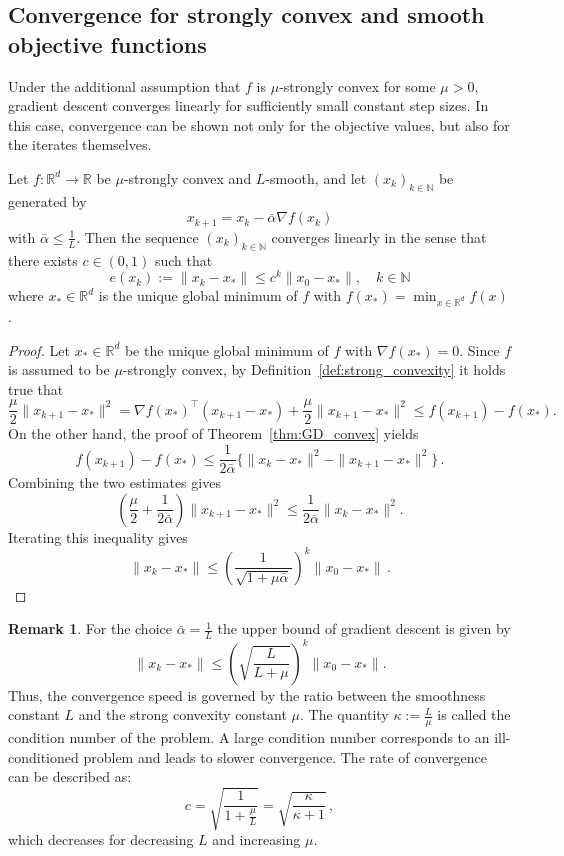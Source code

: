 \documentclass[12pt,openany]{book}
\theoremstyle{definition}
\newtheorem{remark}[thm]{Remark}
\theoremstyle{definition}
\newcommand{\N}{\mathbb{N}}
\newcommand{\R}{\mathbb{R}}
\begin{document}
\subsection{Convergence for strongly convex and smooth objective functions}\label{sec:GD_strongconvex}
Under the additional assumption that $f$ is $\mu$-strongly convex for some $\mu>0$, gradient
descent converges linearly for sufficiently small constant step sizes. In this case, convergence can
be shown not only for the objective values, but also for the iterates themselves.
\begin{thm}\label{thm:GD_strongconvex}
Let $f:\R^d\to\R$ be $\mu$-strongly convex and $L$-smooth, and let $(x_k)_{k\in\N}$ be generated by 
\[x_{k+1} = x_k - \bar\alpha \nabla f(x_k) \]
with 
$\bar\alpha\le \frac{1}{L}$. Then the sequence $(x_k)_{k\in\N}$ converges linearly in the sense that there exists $c\in(0,1)$ such that
\[e(x_k):=\|x_k-x_\ast\| \le c^k\|x_0-x_\ast\|,\quad k\in\N\]
where $x_\ast\in\R^d$ is the unique global minimum of $f$ with $f(x_\ast) = \min_{x\in\R^d} f(x)$. 
\end{thm}
\begin{proof}
Let $x_\ast\in\R^d$ be the unique global minimum of $f$ with $\nabla f(x_\ast)=0$. Since $f$ is assumed to be $\mu$-strongly convex,  by Definition~\ref{def:strong_convexity} it holds true that 
\[\frac{\mu}{2}\|x_{k+1}-x_\ast\|^2 = \nabla f(x_\ast)^\top (x_{k+1}-x_\ast) + \frac{\mu}{2}\|x_{k+1}-x_\ast\|^2 \le f(x_{k+1})-f(x_\ast).\]
On the other hand, the proof of Theorem~\ref{thm:GD_convex} yields
\[f(x_{k+1})-f(x_\ast) \le \frac{1}{2\bar\alpha} \{ \|x_k-x_\ast\|^2-\|x_{k+1}-x_\ast\|^2\}\,. \]
Combining the two estimates gives
\[(\frac{\mu}{2} + \frac{1}{2\bar\alpha}) \|x_{k+1}-x_\ast\|^2 \le \frac{1}{2\bar\alpha} \|x_k-x_\ast\|^2.\]
Iterating this inequality gives
\[
\|x_k-x_\ast\|
\leq
\left(\frac{1}{\sqrt{1+\mu\bar\alpha}}\right)^k
\|x_0-x_\ast\|\,.
\]
\end{proof}
\begin{remark}
For the choice $\bar\alpha = \frac1L$ the upper bound of gradient descent is given by
\[\|x_k-x_\ast\|\le \left(\sqrt{\frac{L}{L+\mu}}\right)^k \|x_0-x_\ast\|. \]
Thus, the convergence speed is governed by the ratio between the smoothness constant $L$ and
the strong convexity constant $\mu$. The quantity
$
\kappa:=\frac{L}{\mu}
$
is called the condition number of the problem. A large condition number corresponds to an
ill-conditioned problem and leads to slower convergence. The rate of convergence can be described as:
\[c= \sqrt{\frac{1}{1+\frac{\mu}L}} = \sqrt{\frac{\kappa}{\kappa+1}}\,, \]
which decreases for decreasing $L$ and increasing $\mu$.
\end{remark}
\end{document}
